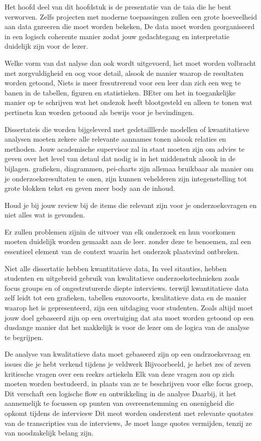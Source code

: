 Het hoofd deel van dit hoofdstuk is de presentatie van de taia die he bent verworven. Zelfs projecten met moderne toepassingen zullen een grote hoeveelheid aan data gnreeren die moet worden bekeken, De data moet worden georganiseerd in een logisch coherente manier zodat jouw gedachtegang en interpretatie duidelijk zijn voor de lezer.

Welke vorm van dat nalyse dan ook wordt uitgevoerd, het moet worden volbracht met zorgvuldigheid en oog voor detail, alsook de manier waarop de resultaten worden getoond, Niets is meer fresutrerend voor een leer dan zich een weg te banen in de tabellen, figuren en statistieken. BEter om het in  toegankelijke manier op te schrijven wat het ondezok heeft blootgesteld en alleen te tonen wat pertinetn kan worden getoond als bewijs voor je bevindingen.


Dissertateis die worden bijgeleverd met gedetailllerde modellen of kwantitatieve analysen moeten zekere alle relevante aannames tonen alsook relaties en methoden. Jouw academische supervisor zal in staat moeten zijn om advies te geven over het level van detaul dat nodig is in het middenstuk alsook in de bijlagen.
grafieken, diagrammen, pei-charts zijn allemaa bruikbaar als manier om je onderzoeksresultaten te onen, zijn kunnen vehelderen zijn  integenstelling tot grote blokken tekst en geven meer body aan de inhoud.

Houd je bij jouw review bij de items die relevant zijn voor je onderzoeksvragen en niet alles wat is gevonden.

Er zullen problemen zijnin de uitvoer van elk onderzoek en hun voorkomen moeten duidelijk worden gemaakt aan de leer. zonder deze te benoemen, zal een essentieel element van de context waarin het onderzok plaatsvind ontbreken.


Niet alle dissertatie hebben kwantitatieve data, In veel sitauties, hebben studenten en uitgebreid gebruik van kwalitatieve onderzoekstechnieken zoals focus groups en of ongestruturerde diepte interviews. terwijl kwantitatieve data zelf leidt tot een grafieken, tabellen enzovoorts, kwalitatieve data en de manier waarop het is gepresenteerd, zijn een uitdaging voor studenten.  Zoals altijd moet jouw doel gebaseerd zijn op een overtuiging dat ata moet worden getoond op een dusdange manier dat het makkelijk is voor de lezer om de logica van de analyse te begrijpen.



De analyse van kwalitatieve data moet gebaseerd zijn op een ondrzoeksvraag en issues die je hebt verkend tijdens je veldwerk Bijvoorbeeld, je hebet zes of zeven kritiesche vragen over een reekrs artiekeln Elk van deze vragen zou op zich moeten worden bestudeerd, in plaats van ze te beschrijven voor elke focus groep, Dit verschaft een logische flow en ontwikkeling in de analyse
Daarbij, it het aannemelijk te focussen op punten van overeenstemming en onenigheid die opkomt tijdens de interviesw Dit meot worden onderstent met relevante quotates van de transcripties van de interviews, Je moet lange quotes vermijden, tenzij ze van noodzakelijk belang zijn.

